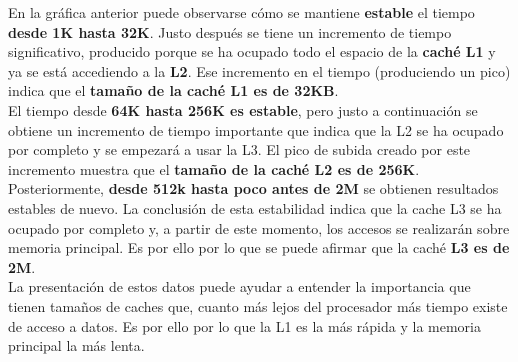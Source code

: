 En la gráfica anterior puede observarse cómo se mantiene
\textbf{estable} el tiempo \textbf{desde 1K hasta 32K}. Justo después se tiene un incremento de tiempo significativo, producido porque se ha ocupado todo el espacio de la \textbf{caché
L1} y ya se está accediendo a la \textbf{L2}. Ese incremento en el tiempo (produciendo un pico) indica que el \textbf{tamaño de la caché L1 es de 32KB}.\\

El tiempo desde \textbf{64K hasta 256K es estable}, pero justo a continuación
se obtiene un incremento de tiempo importante que indica que la L2 se ha
ocupado por completo y se empezará a usar la L3. El pico de subida creado por 
este incremento muestra que el \textbf{tamaño de la caché L2 es de 256K}.\\

Posteriormente, \textbf{desde 512k hasta poco antes de 2M} se obtienen resultados estables de nuevo. La conclusión de esta estabilidad indica que la cache L3 se ha ocupado por completo y, a partir de este momento,
los accesos se realizarán sobre memoria principal. Es por ello por lo que se puede afirmar que la caché \textbf{L3
es de 2M}.
\\

La presentación de estos datos puede ayudar a entender la importancia que tienen tamaños de caches que, cuanto más lejos del procesador más tiempo
existe de acceso a datos. Es por ello por lo que la L1 es la más rápida y la memoria
principal la más lenta.


\newpage


